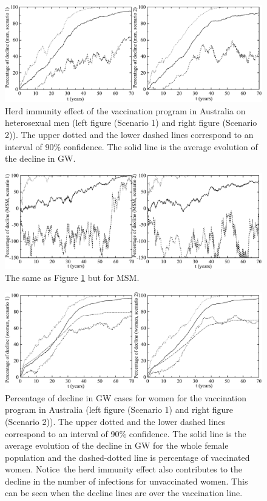 \begin{figure}[H]
	\centering
	\includegraphics[scale=0.55]{FigHerdImmunity1.pdf}
	\caption{Herd immunity effect of the vaccination program in Australia on heterosexual men (left figure (Scenario 1) and right figure (Scenario 2)). The upper dotted and the lower dashed lines correspond to an interval of 90\% confidence. The solid line
		is the average evolution of the decline in GW.}
	\label{fig5}
\end{figure}
\vspace{-12pt}
\begin{figure}[H]
	\centering
	\includegraphics[scale=0.55]{FigHerdImmunity3.pdf}
	\caption{The same as Figure \protect\ref{fig5} but for MSM.}
	\label{fig7}
\end{figure}
\vspace{-12pt}
\begin{figure}[H]
	\centering
	\includegraphics[scale=0.55]{FigHerdImmunity2.pdf}
	\caption{Percentage of decline in GW cases for women for the vaccination program in Australia (left figure (Scenario 1) and right figure (Scenario 2)). The upper dotted and the lower dashed lines correspond to an interval of 90\% confidence. The solid line
		is the average evolution of the decline in GW for the whole female population and the dashed-dotted line is percentage of vaccinated women. Notice~the herd immunity effect also contributes to the decline in the number of infections for unvaccinated women. This can be seen when the decline lines are over the vaccination line.}
	\label{fig6}
\end{figure}

